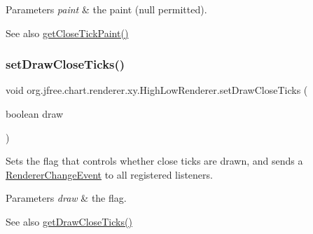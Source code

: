 \begin{DoxyParams}{Parameters}
{\em paint} & the paint ({\ttfamily null} permitted).\\
\hline
\end{DoxyParams}
\begin{DoxySeeAlso}{See also}
\mbox{\hyperlink{classorg_1_1jfree_1_1chart_1_1renderer_1_1xy_1_1_high_low_renderer_a948cf128b2e7f01d815dc351cd2f3286}{get\+Close\+Tick\+Paint()}} 
\end{DoxySeeAlso}
\mbox{\label{classorg_1_1jfree_1_1chart_1_1renderer_1_1xy_1_1_high_low_renderer_aeb8b735bd5d7b60340adb7d575c9e51a}} 
\subsubsection{\texorpdfstring{set\+Draw\+Close\+Ticks()}{setDrawCloseTicks()}}
{\footnotesize\ttfamily void org.\+jfree.\+chart.\+renderer.\+xy.\+High\+Low\+Renderer.\+set\+Draw\+Close\+Ticks (\begin{DoxyParamCaption}\item[{boolean}]{draw }\end{DoxyParamCaption})}

Sets the flag that controls whether close ticks are drawn, and sends a \mbox{\hyperlink{}{Renderer\+Change\+Event}} to all registered listeners.


\begin{DoxyParams}{Parameters}
{\em draw} & the flag.\\
\hline
\end{DoxyParams}
\begin{DoxySeeAlso}{See also}
\mbox{\hyperlink{classorg_1_1jfree_1_1chart_1_1renderer_1_1xy_1_1_high_low_renderer_a5e9153dd2313078005e9eb7b6f5befae}{get\+Draw\+Close\+Ticks()}} 
\end{DoxySeeAlso}
\mbox{\label{classorg_1_1jfree_1_1chart_1_1renderer_1_1xy_1_1_high_low_renderer_aadd13238450e724e2fe9d8143fe105bc}} 

